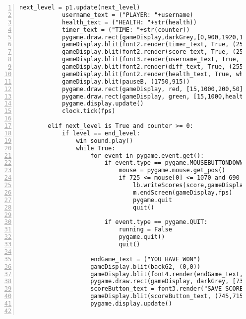 \documentclass[12pt]{report}
\begin{document}
\begin{Verbatim}[numbers=left, frame=single]
            next_level = p1.update(next_level)
            username_text = ("PLAYER: "+username)
            health_text = ("HEALTH: "+str(health))
            timer_text = ("TIME: "+str(counter))
            pygame.draw.rect(gameDisplay,darkGrey,[0,900,1920,180])
            gameDisplay.blit(font2.render(timer_text, True, (255, 255, 255)), (700, 950))
            gameDisplay.blit(font2.render(score_text, True, (255, 255, 255)), (700, 920))
            gameDisplay.blit(font3.render(username_text, True, white), (15,930))
            gameDisplay.blit(font2.render(diff_text, True, (255, 255, 255)), (700, 1010))
            gameDisplay.blit(font2.render(health_text, True, white), (700, 980))
            gameDisplay.blit(pauseB, (1750,915))
            pygame.draw.rect(gameDisplay, red, [15,1000,200,50])
            pygame.draw.rect(gameDisplay, green, [15,1000,health,50])
            pygame.display.update()                                                                     
            clock.tick(fps)                                                                             

        elif next_level is True and counter >= 0:
            if level == end_level:
                win_sound.play()
                while True:
                    for event in pygame.event.get():
                        if event.type == pygame.MOUSEBUTTONDOWN:
                            mouse = pygame.mouse.get_pos()
                            if 725 <= mouse[0] <= 1070 and 690 <= mouse[1] <= 770:
                                lb.writeScores(score,gameDisplay,fps,username)
                                m.endScreen(gameDisplay,fps)
                                pygame.quit
                                quit()
                                
                        if event.type == pygame.QUIT:                                                       
                            running = False
                            pygame.quit()
                            quit()

                    endGame_text = ("YOU HAVE WON")
                    gameDisplay.blit(backG2, (0,0))
                    gameDisplay.blit(font4.render(endGame_text, True, (255, 255, 255)), (50, 50))
                    pygame.draw.rect(gameDisplay, darkGrey, [735, 700, 350 , 66])
                    scoreButton_text = font3.render("SAVE SCORE", True, white)
                    gameDisplay.blit(scoreButton_text, (745,715))
                    pygame.display.update()   
                        

\end{Verbatim}
\end{document}
